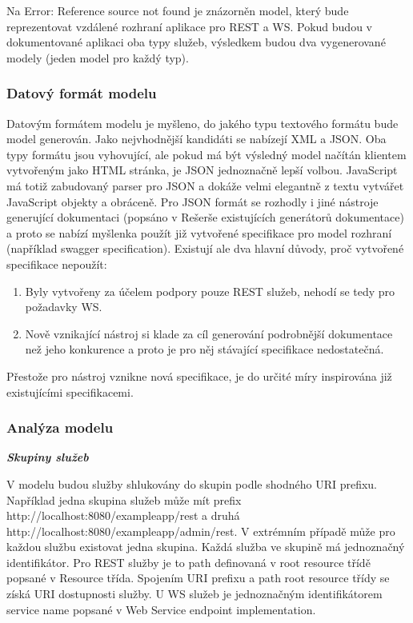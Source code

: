 \documentclass[11pt,twoside,a4paper]{book}
\begin{document}
Na Error: Reference source not found je znázorněn model, který bude reprezentovat vzdálené
rozhraní aplikace pro REST a WS. Pokud budou v dokumentované aplikaci oba typy služeb,
výsledkem budou dva vygenerované modely (jeden model pro každý typ).

\subsubsection{Datový formát modelu}

Datovým formátem modelu je myšleno, do jakého typu textového formátu bude model
generován. Jako nejvhodnější kandidáti se nabízejí XML a JSON. Oba typy formátu jsou
vyhovující, ale pokud má být výsledný model načítán klientem vytvořeným jako HTML
stránka, je JSON jednoznačně lepší volbou. JavaScript má totiž zabudovaný parser pro JSON
a dokáže velmi elegantně z textu vytvářet JavaScript objekty a obráceně. Pro JSON formát se
rozhodly i jiné nástroje generující dokumentaci (popsáno v Rešerše existujících generátorů
dokumentace) a proto se nabízí myšlenka použít již vytvořené specifikace pro model rozhraní
(například swagger specification). Existují ale dva hlavní důvody, proč vytvořené specifikace
nepoužít:

\begin{enumerate}
  \item Byly vytvořeny za účelem podpory pouze REST služeb, nehodí se tedy pro požadavky
WS.
  \item Nově vznikající nástroj si klade za cíl generování podrobnější dokumentace než jeho
konkurence a proto je pro něj stávající specifikace nedostatečná.
\end{enumerate}

Přestože pro nástroj vznikne nová specifikace, je do určité míry inspirována již existujícími
specifikacemi.

\subsubsection{Analýza modelu}

\textbf{\textit{Skupiny služeb}}

V modelu budou služby shlukovány do skupin podle shodného URI prefixu. Například jedna
skupina služeb může mít prefix http://localhost:8080/exampleapp/rest a
druhá http://localhost:8080/exampleapp/admin/rest. V extrémním případě
může pro každou službu existovat jedna skupina. Každá služba ve skupině má jednoznačný
identifikátor. Pro REST služby je to path definovaná v root resource třídě popsané v Resource
třída. Spojením URI prefixu a path root resource třídy se získá URI dostupnosti služby. U WS
služeb je jednoznačným identifikátorem service name popsané v Web Service endpoint
implementation.
\end{document}
